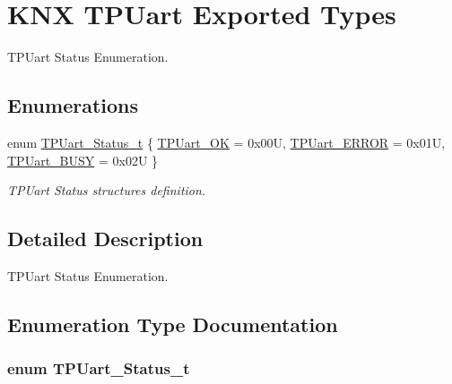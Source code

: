 \hypertarget{group___k_n_x___t_p_uart___exported___types}{}\section{K\+NX T\+P\+Uart Exported Types}
\label{group___k_n_x___t_p_uart___exported___types}


T\+P\+Uart Status Enumeration.  


\subsection*{Enumerations}
\begin{DoxyCompactItemize}
\item 
enum \hyperlink{group___k_n_x___t_p_uart___exported___types_ga75271248dbdd8cec608012ca76739f36}{T\+P\+Uart\+\_\+\+Status\+\_\+t} \{ \hyperlink{group___k_n_x___t_p_uart___exported___types_gga75271248dbdd8cec608012ca76739f36aa8bc181a8cd20f68faf0314359f58a25}{T\+P\+Uart\+\_\+\+OK} = 0x00U, 
\hyperlink{group___k_n_x___t_p_uart___exported___types_gga75271248dbdd8cec608012ca76739f36add998069d703bc6f9b5aea74aa1e501e}{T\+P\+Uart\+\_\+\+E\+R\+R\+OR} = 0x01U, 
\hyperlink{group___k_n_x___t_p_uart___exported___types_gga75271248dbdd8cec608012ca76739f36a21db4f39de08b0f35eb903cde75a2ed9}{T\+P\+Uart\+\_\+\+B\+U\+SY} = 0x02U
 \}\begin{DoxyCompactList}\small\item\em T\+P\+Uart Status structures definition. \end{DoxyCompactList}
\end{DoxyCompactItemize}


\subsection{Detailed Description}
T\+P\+Uart Status Enumeration. 



\subsection{Enumeration Type Documentation}
\subsubsection[{\texorpdfstring{T\+P\+Uart\+\_\+\+Status\+\_\+t}{TPUart_Status_t}}]{\setlength{\rightskip}{0pt plus 5cm}enum {\bf T\+P\+Uart\+\_\+\+Status\+\_\+t}}\hypertarget{group___k_n_x___t_p_uart___exported___types_ga75271248dbdd8cec608012ca76739f36}{}\label{group___k_n_x___t_p_uart___exported___types_ga75271248dbdd8cec608012ca76739f36}


